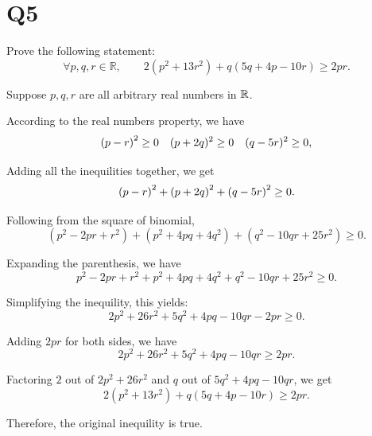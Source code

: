 \section{Q5}
\begin{problem}
    Prove the following statement:
    \[
        \forall p,q,r\in\mathbb{R},
        \qquad
        2(p^2+13r^2)
        +q(5q+4p-10r)
        \geq 2pr.
    \]
\end{problem}

\begin{solution}
    Suppose $p, q, r$ are all arbitrary real numbers in $\mathbb{R}$. 

    According to the real numbers property, we have 
    \begin{equation*}
        \left(p - r\right)^2 \geq 0 \quad (p + 2q)^2 \geq 0 \quad (q - 5r)^2 \geq 0,  
    \end{equation*}

    Adding all the inequilities together, we get 
    \begin{equation*}
        \left(p - r\right)^2 + \left(p + 2q\right)^2 + \left(q - 5r\right)^2 \geq 0. 
    \end{equation*}

    Following from the square of binomial, 
    \begin{equation*}
         (p^2 - 2pr + r^2) + (p^2 + 4pq + 4q^2) + (q^2 - 10qr + 25r^2) \geq 0. 
    \end{equation*}

    Expanding the parenthesis, we have 
    \begin{equation*}
         p^2 - 2pr + r^2 + p^2 + 4pq + 4q^2 + q^2 - 10qr + 25r^2 \geq 0. 
    \end{equation*}

    Simplifying the inequility, this yields:
    \begin{equation*}
        2p^2 + 26r^2 + 5q^2 + 4pq - 10qr - 2pr \geq 0. 
    \end{equation*}
    
    Adding $2pr$ for both sides, we have 
    \begin{equation*}
        2p^2 + 26r^2 + 5q^2 + 4pq - 10qr \geq 2pr. 
    \end{equation*}

    Factoring $2$ out of $2p^2 + 26r^2$ and $q$ out of  $5q^2 + 4pq - 10qr$, we get 
    \[
        2(p^2+13r^2)
        +q(5q+4p-10r)
        \geq 2pr.
    \]

    Therefore, the original inequility is true. 
\end{solution}